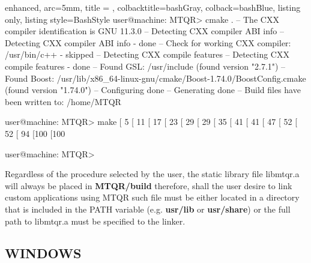 \documentclass[a4paper, twosided]{book}
\begin{document}
\vspace{0.2cm}
\begin{tcblisting}{enhanced,
                   arc=5mm,
                   title = \color{black}{\large \ttfamily Build using CMake},
                   colbacktitle=bashGray,
                   colback=bashBlue,
                   listing only,
                   listing style=BashStyle}
user@machine: MTQR> cmake .
-- The CXX compiler identification is GNU 11.3.0
-- Detecting CXX compiler ABI info
-- Detecting CXX compiler ABI info - done
-- Check for working CXX compiler: /usr/bin/c++ - skipped
-- Detecting CXX compile features
-- Detecting CXX compile features - done
-- Found GSL: /usr/include (found version "2.7.1") 
-- Found Boost: /usr/lib/x86_64-linux-gnu/cmake/Boost-1.74.0/BoostConfig.cmake (found version "1.74.0")  
-- Configuring done
-- Generating done
-- Build files have been written to: /home/MTQR

user@machine: MTQR> make
[  5%
[ 11%
[ 17%
[ 23%
[ 29%
[ 29%
[ 35%
[ 41%
[ 41%
[ 47%
[ 52%
[ 52%
[ 94%
[100%
[100%

user@machine: MTQR>
\end{tcblisting}

\newpage
\noindent
Regardless of the procedure selected by the user, the static library file \colorbox{poliGrayBlue}{libmtqr.a} will always be placed in \colorbox{poliGrayBlue}{\textbf{MTQR/build}} therefore, shall the user desire to link custom applications using MTQR such file must be either located in a directory that is included in the \colorbox{poliGrayBlue}{PATH} variable (e.g. \colorbox{poliGrayBlue}{\textbf{usr/lib}} or \colorbox{poliGrayBlue}{\textbf{usr/share}}) or the full path to \colorbox{poliGrayBlue}{libmtqr.a} must be specified to the linker.

\subsection[Windows]{\changefont WINDOWS}\label{SubSec2.3.2}
\end{document}
